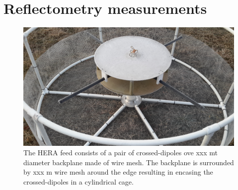 \documentclass[twocolumn]{emulateapj}
\begin{document}
  
\section{\textbf{Reflectometry measurements}}
\begin{figure}
\centering
\includegraphics[trim={2cm 10cm 20cm 5cm},clip, totalheight=0.3\textheight]{plots/herafeed.jpg}
\vspace{1.0 em}
\caption{The HERA feed consists of a pair of crossed-dipoles ove xxx mt diameter backplane made of wire mesh. The backplane is surrounded by xxx m wire mesh around the edge resulting in encasing the crossed-dipoles in a cylindrical cage.}
\label{fig:herafeed}
\end{figure}
\end{document}
